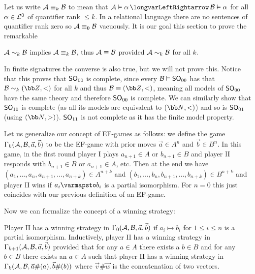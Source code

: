 \eexam

Let us write ${\cal A}\equiv_k{\cal B}$ to mean that ${\cal A}\vDash\alpha\iff{\cal B}\vDash\alpha$ for all $\alpha\in{\cal L}^0$ of quantifier rank $\leq k$.
In a relational language there are no sentences of quantifier rank zero so ${\cal A}\equiv_0{\cal B}$ vacuously.
It is our goal this section to prove the remarkable

\bthrm[name=efgametheorem]

    ${\cal A}\sim_k{\cal B}$ implies ${\cal A}\equiv_k{\cal B}$, thus ${\cal A}\equiv{\cal B}$ provided ${\cal A}\sim_k{\cal B}$ for all $k$.

\ethrm

In finite signatures the converse is also true, but we will not prove this.
Notice that this proves that ${\sf SO}_{00}$ is complete, since every ${\cal B}\vDash{\sf SO}_{00}$ has that ${\cal B}\sim_k({\bb Z},<)$ for all $k$ and thus ${\cal B}\equiv({\bb Z},<)$, meaning
all models of ${\sf SO}_{00}$ have the same theory and therefore ${\sf SO}_{00}$ is complete.
We can similarly show that ${\sf SO}_{10}$ is complete (as all its models are equivalent to $({\bb N},<)$) and so is ${\sf SO}_{01}$ (using $({\bb N},>)$).
${\sf SO}_{11}$ is not complete as it has the finite model property.

Let us generalize our concept of EF-games as follows: we define the game $\Gamma_k({\cal A},{\cal B},\vec a,\vec b)$ to be the EF-game with prior moves $\vec a\in A^n$ and $\vec b\in B^n$.
In this game, in the first round player I plays $a_{n+1}\in A$ or $b_{n+1}\in B$ and player II responds with $b_{n+1}\in B$ or $a_{n+1}\in A$, etc.
Then at the end we have $(a_1,\dots,a_n,a_{n+1},\dots,a_{n+k})\in A^{n+k}$ and $(b_1,\dots,b_n,b_{n+1},\dots,b_{n+k})\in B^{n+k}$ and player II wins if $a_i\varmapsto b_i$ is a partial isomorphism.
For $n=0$ this just coincides with our previous definition of an EF-game.

Now we can formalize the concept of a winning strategy:

\bdefn

    Player II has a {\emphcolor winning strategy} in $\Gamma_0({\cal A},{\cal B},\vec a,\vec b)$ if $a_i\mapsto b_i$ for $1\leq i\leq n$ is a partial isomorphism.
    Inductively, player II has a winning strategy in $\Gamma_{k+1}({\cal A},{\cal B},\vec a,\vec b)$ provided that for any $a\in A$ there exists a $b\in B$ and for any $b\in B$ there exists an $a\in A$
    such that player II has a winning strategy in $\Gamma_k({\cal A},{\cal B},\vec a\#(a),\vec b\#(b))$ where $\vec v\#\vec w$ is the concatenation of two vectors.

